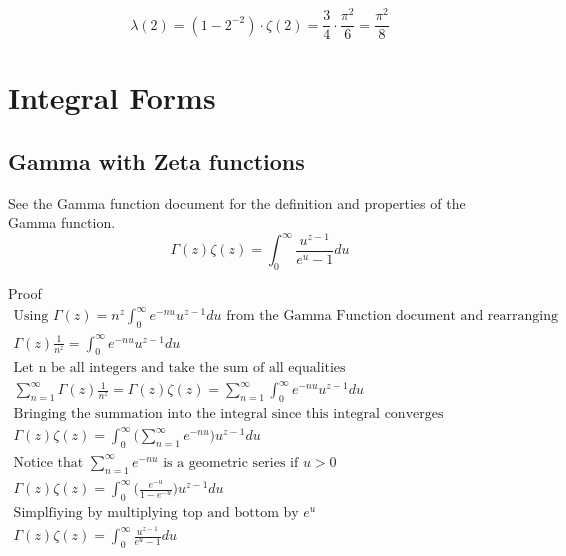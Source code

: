 \documentclass[a4paper]{article}
\begin{document}
\begin{equation} 
\lambda(2) = (1 - 2^{-2}) \cdot \zeta(2) =
\frac{3}{4} \cdot \frac{\pi^2}{6} = \frac{\pi^2}{8} 
\end{equation}

\pagebreak

\section{Integral Forms}
\subsection{Gamma with Zeta functions}
\begin{theorem}
See the Gamma function document for the definition and properties of the Gamma function.
\begin{equation}
\boxed{
\Gamma(z) \zeta(z) = \int_{0}^{\infty} \frac{u^{z-1}}{e^{u} - 1} du}
\end{equation}

Proof
\\
\begin{gather*}
\text{Using $\Gamma(z) = n^z  \int_{0}^{\infty} e^{-n u} u^{z-1} du$ from the Gamma Function document and rearranging}
\\
\Gamma(z) \frac{1}{n^z} =  \int_{0}^{\infty} e^{-n u} u^{z-1} du
\\
\text{Let n be all integers and take the sum of all equalities}
\\
\sum_{n=1}^{\infty} \Gamma(z) \frac{1}{n^z} 
=
\Gamma(z) \zeta(z)
= 
\sum_{n=1}^{\infty} \int_{0}^{\infty} e^{-n u} u^{z-1} du
\\
\text{Bringing the summation into the integral since this integral converges uniformly}
\\
\Gamma(z) \zeta(z) =  \int_{0}^{\infty} \Big( \sum_{n=1}^{\infty} e^{-n u} \Big) u^{z-1} du
\\
\text{Notice that $\sum_{n=1}^{\infty} e^{-n u}$ is a geometric series if $u>0$}
\\
\Gamma(z) \zeta(z) =  \int_{0}^{\infty} \Big(\frac{e^{-u}}{1-e^{-u}} \Big) u^{z-1} du
\\
\text{Simplfiying by multiplying top and bottom by $e^u$}
\\
\Gamma(z) \zeta(z) =  \int_{0}^{\infty} \frac{u^{z-1}}{e^u -1} du
\end{gather*}
\end{theorem}

\pagebreak
\end{document}
